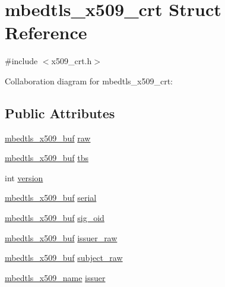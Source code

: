 \hypertarget{structmbedtls__x509__crt}{}\section{mbedtls\+\_\+x509\+\_\+crt Struct Reference}
\label{structmbedtls__x509__crt}


{\ttfamily \#include $<$x509\+\_\+crt.\+h$>$}



Collaboration diagram for mbedtls\+\_\+x509\+\_\+crt\+:
\subsection*{Public Attributes}
\begin{DoxyCompactItemize}
\item 
\mbox{\hyperlink{group__x509__module_ga4d02c9e8e4e2934555e0d132cd2976dc}{mbedtls\+\_\+x509\+\_\+buf}} \mbox{\hyperlink{structmbedtls__x509__crt_a5bfef6b8b81bc081f796cb1f6bb28839}{raw}}
\item 
\mbox{\hyperlink{group__x509__module_ga4d02c9e8e4e2934555e0d132cd2976dc}{mbedtls\+\_\+x509\+\_\+buf}} \mbox{\hyperlink{structmbedtls__x509__crt_a44e9a884baad5737ef0930af94ca3f94}{tbs}}
\item 
int \mbox{\hyperlink{structmbedtls__x509__crt_a879ea07a05ab857c0f5793572bf1696e}{version}}
\item 
\mbox{\hyperlink{group__x509__module_ga4d02c9e8e4e2934555e0d132cd2976dc}{mbedtls\+\_\+x509\+\_\+buf}} \mbox{\hyperlink{structmbedtls__x509__crt_a5c3ae8b4aba6e1c40cb1f6a85da36116}{serial}}
\item 
\mbox{\hyperlink{group__x509__module_ga4d02c9e8e4e2934555e0d132cd2976dc}{mbedtls\+\_\+x509\+\_\+buf}} \mbox{\hyperlink{structmbedtls__x509__crt_a128c3a665ffdce696b402435a74e97aa}{sig\+\_\+oid}}
\item 
\mbox{\hyperlink{group__x509__module_ga4d02c9e8e4e2934555e0d132cd2976dc}{mbedtls\+\_\+x509\+\_\+buf}} \mbox{\hyperlink{structmbedtls__x509__crt_afb876a6a7b85e160620c4549324d9e8d}{issuer\+\_\+raw}}
\item 
\mbox{\hyperlink{group__x509__module_ga4d02c9e8e4e2934555e0d132cd2976dc}{mbedtls\+\_\+x509\+\_\+buf}} \mbox{\hyperlink{structmbedtls__x509__crt_ac30aeab20c2cdf74dae631d6d0691651}{subject\+\_\+raw}}
\item 
\mbox{\hyperlink{group__x509__module_ga2272228c7776102328df31623af3168c}{mbedtls\+\_\+x509\+\_\+name}} \mbox{\hyperlink{structmbedtls__x509__crt_ade48d67edd24629e28361d3fbc0aafd9}{issuer}}

\end{DoxyCompactItemize}

